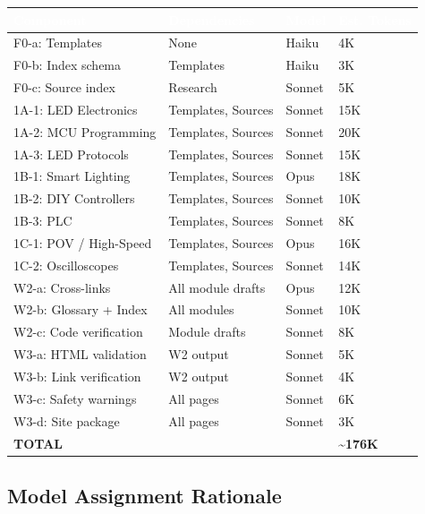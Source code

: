 \documentclass[11pt,letterpaper]{article}
\newcommand{\tableheader}[1]{\textbf{\sffamily\textcolor{white}{#1}}}
\begin{document}
\begin{center}
\begin{tabularx}{\textwidth}{L{3cm}L{3cm}C{1.5cm}C{1.5cm}}
\toprule
{}
\tableheader{Component} & \tableheader{Dependencies} & \tableheader{Model} & \tableheader{Est. Tokens} \\
\midrule
F0-a: Templates & None & Haiku & 4K \\
F0-b: Index schema & Templates & Haiku & 3K \\
F0-c: Source index & Research & Sonnet & 5K \\
1A-1: LED Electronics & Templates, Sources & Sonnet & 15K \\
1A-2: MCU Programming & Templates, Sources & Sonnet & 20K \\
1A-3: LED Protocols & Templates, Sources & Sonnet & 15K \\
1B-1: Smart Lighting & Templates, Sources & Opus & 18K \\
1B-2: DIY Controllers & Templates, Sources & Sonnet & 10K \\
1B-3: PLC & Templates, Sources & Sonnet & 8K \\
1C-1: POV / High-Speed & Templates, Sources & Opus & 16K \\
1C-2: Oscilloscopes & Templates, Sources & Sonnet & 14K \\
W2-a: Cross-links & All module drafts & Opus & 12K \\
W2-b: Glossary + Index & All modules & Sonnet & 10K \\
W2-c: Code verification & Module drafts & Sonnet & 8K \\
W3-a: HTML validation & W2 output & Sonnet & 5K \\
W3-b: Link verification & W2 output & Sonnet & 4K \\
W3-c: Safety warnings & All pages & Sonnet & 6K \\
W3-d: Site package & All pages & Sonnet & 3K \\
\midrule
\textbf{TOTAL} & & & \textbf{\textasciitilde 176K} \\
\bottomrule
\end{tabularx}
\end{center}

\subsection{Model Assignment Rationale}
\end{document}
